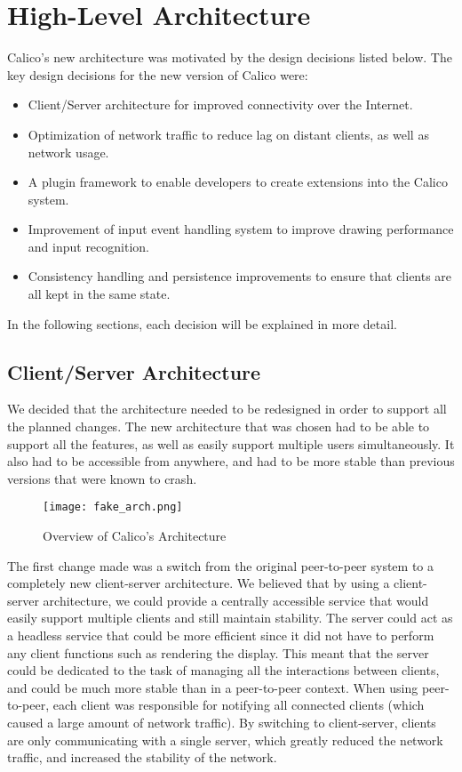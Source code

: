 \chapter{High-Level Architecture}

Calico's new architecture was motivated by the design decisions listed below. 
The key design decisions for the new version of Calico were:

\begin{itemize}\itemsep1pt
  \item Client/Server architecture for improved connectivity over the Internet.
  \item Optimization of network traffic to reduce lag on distant clients, as well as network usage.
  \item A plugin framework to enable developers to create extensions into the Calico system.
  \item Improvement of input event handling system to improve drawing performance and input recognition.
  \item Consistency handling and persistence improvements to ensure that clients are all kept in the same state.
\end{itemize}

In the following sections, each decision will be explained in more detail.



\section{Client/Server Architecture}
We decided that the architecture needed to be redesigned in order to support all the planned changes. The new architecture that was chosen had to be able to support all the features, as well as easily support multiple users simultaneously. It also had to be accessible from anywhere, and had to be more stable than previous versions that were known to crash.

\begin{figure}[h]
\centering
\texttt{[image: fake\_arch.png]}
\caption{Overview of Calico's Architecture}
\label{fig:calico_arch}
\end{figure}

The first change made was a switch from the original peer-to-peer system to a completely new client-server architecture. We believed that by using a client-server architecture, we could provide a centrally accessible service that would easily support multiple clients and still maintain stability. The server could act as a headless service that could be more efficient since it did not have to perform any client functions such as rendering the display. This meant that the server could be dedicated to the task of managing all the interactions between clients, and could be much more stable than in a peer-to-peer context. When using peer-to-peer, each client was responsible for notifying all connected clients (which caused a large amount of network traffic). By switching to client-server, clients are only communicating with a single server, which greatly reduced the network traffic, and increased the stability of the network.

